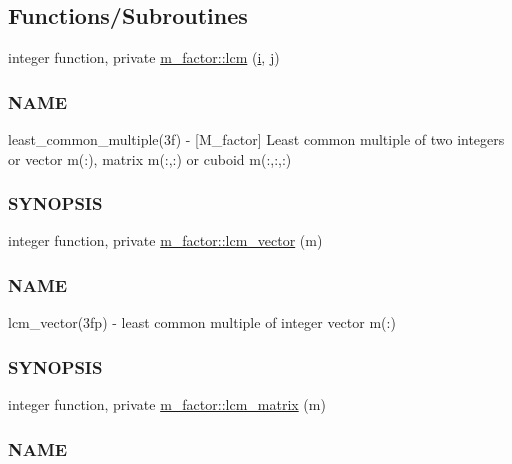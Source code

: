 \subsection*{Functions/\+Subroutines}
\begin{DoxyCompactItemize}
\item 
integer function, private \hyperlink{namespacem__factor_a363e0b451d99647a6230a308ffccc73c}{m\+\_\+factor\+::lcm} (\hyperlink{intro__blas1_83_8txt_a8ba82a50c0c2c12d5f6a77f7e4651c0b}{i}, \hyperlink{exit_87_8txt_a8921ef29c441e427867c54bd3b2462ba}{j})
\begin{DoxyCompactList}\small\item\em \subsubsection*{N\+A\+ME}

least\+\_\+common\+\_\+multiple(3f) -\/ \mbox{[}M\+\_\+factor\mbox{]} Least common multiple of two integers or vector m(\+:), matrix m(\+:,\+:) or cuboid m(\+:,\+:,\+:) \subsubsection*{S\+Y\+N\+O\+P\+S\+IS}\end{DoxyCompactList}\item 
integer function, private \hyperlink{namespacem__factor_a3802e87d5a394888aefc2d6cf496509f}{m\+\_\+factor\+::lcm\+\_\+vector} (m)
\begin{DoxyCompactList}\small\item\em \subsubsection*{N\+A\+ME}

lcm\+\_\+vector(3fp) -\/ least common multiple of integer vector m(\+:) \subsubsection*{S\+Y\+N\+O\+P\+S\+IS}\end{DoxyCompactList}\item 
integer function, private \hyperlink{namespacem__factor_af2cc63a43164bf57aedac557fafe907f}{m\+\_\+factor\+::lcm\+\_\+matrix} (m)
\begin{DoxyCompactList}\small\item\em \subsubsection*{N\+A\+ME}


\end{DoxyCompactList}
\end{DoxyCompactItemize}
